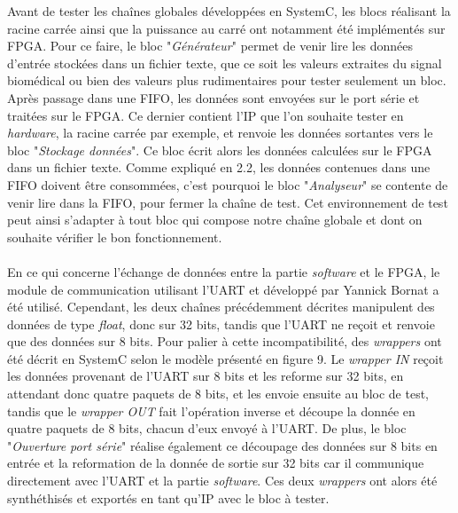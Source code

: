 \documentclass[a4paper,12pt]{article}
\begin{document}
Avant de tester les chaînes globales développées en SystemC, les blocs réalisant la racine carrée ainsi que la puissance au carré ont notamment été implémentés sur FPGA. Pour ce faire, le bloc "\textit{Générateur}" permet de venir lire les données d'entrée stockées dans un fichier texte, que ce soit les valeurs extraites du signal biomédical ou bien des valeurs plus rudimentaires pour tester seulement un bloc. Après passage dans une FIFO, les données sont envoyées sur le port série et traitées sur le FPGA. Ce dernier contient l'IP que l'on souhaite tester en \textit{hardware}, la racine carrée par exemple, et renvoie les données sortantes vers le bloc "\textit{Stockage données}". Ce bloc écrit alors les données calculées sur le FPGA dans un fichier texte. Comme expliqué en 2.2, les données contenues dans une FIFO doivent être consommées, c'est pourquoi le bloc "\textit{Analyseur}" se contente de venir lire dans la FIFO, pour fermer la chaîne de test. Cet environnement de test peut ainsi s'adapter à tout bloc qui compose notre chaîne globale et dont on souhaite vérifier le bon fonctionnement. \\ \\
\indent En ce qui concerne l'échange de données entre la partie \textit{software} et le FPGA, le module de communication utilisant l'UART et développé par Yannick Bornat a été utilisé. Cependant, les deux chaînes précédemment décrites manipulent des données de type \textit{float}, donc sur 32 bits, tandis que l'UART ne reçoit et renvoie que des données sur 8 bits. Pour palier à cette incompatibilité, des \textit{wrappers} ont été décrit en SystemC selon le modèle présenté en figure 9. Le \textit{wrapper IN} reçoit les données provenant de l'UART sur 8 bits et les reforme sur 32 bits, en attendant donc quatre paquets de 8 bits, et les envoie ensuite au bloc de test, tandis que le \textit{wrapper OUT} fait l'opération inverse et découpe la donnée en quatre paquets de 8 bits, chacun d'eux envoyé à l'UART. De plus, le bloc "\textit{Ouverture port série}" réalise également ce découpage des données sur 8 bits en entrée et la reformation de la donnée de sortie sur 32 bits car il communique directement avec l'UART et la partie \textit{software}. Ces deux \textit{wrappers} ont alors été synthéthisés et exportés en tant qu'IP avec le bloc à tester.  
\end{document}
